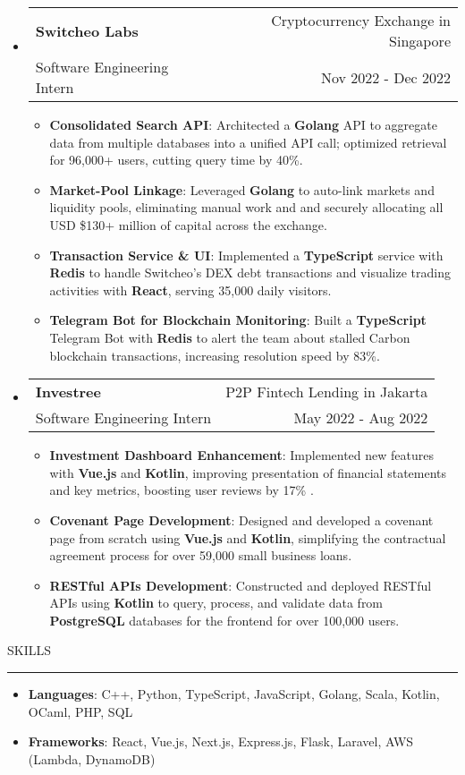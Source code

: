 \documentclass[letterpaper, 11pt]{article}
\makeatletter
\def\sectionlineskip{\medskip}
\def\sectionskip{\medskip}
\def \entryspacing {-0pt}
\newcommand{\SectionHeading}[1]{
  \sectionskip
  \raggedright\raggedbottom\MakeUppercase{\large{#1}}
  \sectionlineskip
  \hrule
  \color{black}
}
\newcommand{\ResumeEntryTSDL}[4]{
  \vspace{-1pt}\item
    \begin{tabular*}{\textwidth}[t]{l@{\extracolsep{\fill}}r} 
      \textbf{#1} & #2 \\
      #3 & #4 \\
    \end{tabular*}\vspace{-4pt}
}
\newcommand{\ResumeItem}[2]{
  \item{
    \textbf{#1}{: #2 \vspace{-2pt}}
  }
}
\newcommand{\ResumeSubItem}[2]{\ResumeItem{#1}{#2}\vspace{-4pt}}
\newcommand{\ResumeEntryStart}{\begin{itemize}[leftmargin=2mm, label={}]}
\newcommand{\ResumeEntryEnd}{\end{itemize}\vspace{-7pt}}
\newcommand{\ResumeItemListStart}{\begin{itemize}[leftmargin=5mm, label=$\bullet$]}
\newcommand{\ResumeItemListEnd}{\end{itemize}}
\newcommand{\ProjectItemListStart}{\begin{itemize}[leftmargin=*, label=$\bullet$]}
\newcommand{\ProjectItemListEnd}{\end{itemize}\vspace{\entryspacing}}
\makeatother
\begin{document}
  \ResumeEntryStart
    \ResumeEntryTSDL{Switcheo Labs}{Cryptocurrency Exchange in Singapore}{Software Engineering Intern}{Nov 2022 - Dec 2022}
    \ResumeItemListStart
    \ResumeItem{Consolidated Search API}
      {Architected a \textbf{Golang} API to aggregate data from multiple databases into a unified API call; optimized retrieval for 96,000+ users, cutting query time by 40\%.}
    \ResumeItem{Market-Pool Linkage}
      {Leveraged \textbf{Golang} to auto-link markets and liquidity pools, eliminating manual work and and securely allocating all USD \$130+ million of capital across the exchange.}
    \ResumeItem{Transaction Service \& UI}
      {Implemented a \textbf{TypeScript} service with \textbf{Redis} to handle Switcheo's DEX debt transactions and visualize trading activities with \textbf{React}, serving 35,000 daily visitors.}
    \ResumeItem{Telegram Bot for Blockchain Monitoring}
      {Built a \textbf{TypeScript} Telegram Bot with \textbf{Redis} to alert the team about stalled Carbon blockchain transactions, increasing resolution speed by 83\%.}
    \ResumeItemListEnd
  \ResumeEntryEnd

  \ResumeEntryStart
    \ResumeEntryTSDL{Investree}{P2P Fintech Lending in Jakarta}{Software Engineering Intern}{May 2022 - Aug 2022}
    \ResumeItemListStart
      \ResumeItem{Investment Dashboard Enhancement}
      {Implemented new features with \textbf{Vue.js} and \textbf{Kotlin}, improving presentation of financial statements and key metrics, boosting user reviews by 17\%}.
      \ResumeItem{Covenant Page Development}
        {Designed and developed a covenant page from scratch using \textbf{Vue.js} and \textbf{Kotlin}, simplifying the contractual agreement process for over 59,000 small business loans.}
      \ResumeItem{RESTful APIs Development}
        {Constructed and deployed RESTful APIs using \textbf{Kotlin} to query, process, and validate data from \textbf{PostgreSQL} databases for the frontend for over 100,000 users.}
    \ResumeItemListEnd
  \ResumeEntryEnd


  \SectionHeading{Skills}
  \ResumeEntryStart
    \ResumeItem{Languages}{C++, Python, TypeScript, JavaScript, Golang, Scala, Kotlin, OCaml, PHP, SQL}
    \ResumeItem{Frameworks}{React, Vue.js, Next.js, Express.js, Flask, Laravel, AWS (Lambda, DynamoDB)}
  \ResumeEntryEnd
\end{document}
